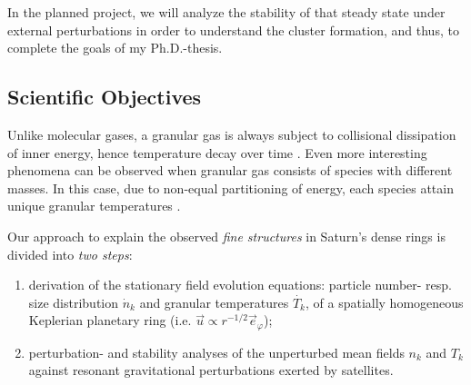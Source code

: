 \documentclass[11pt, notitlepage]{article} %
\begin{document}
In the planned project, we will analyze the stability of that steady state under external perturbations in order to understand the
cluster formation, and thus, to complete the goals of my Ph.D.-thesis.\\

\subsection*{Scientific Objectives}

Unlike molecular gases, a granular gas is always subject to collisional dissipation of inner energy, hence temperature decay 
over time \citep{Haff1983, Brilliantov2004}. Even more interesting phenomena can be observed when granular gas consists of 
species with different masses. In this case,  due to non-equal partitioning of energy, each species attain unique granular
temperatures \citep{Garzo2007c, Osinsky2020}. 

Our approach to explain the observed \emph{fine structures} in Saturn's dense rings is divided into \emph{two steps}:
\begin{enumerate}
      \item derivation of the stationary field evolution equations:  particle number- resp. size distribution $\dot n_k$ and granular 
      temperatures $\dot {T_k}$, of a spatially homogeneous Keplerian planetary ring (i.e. $\vec u \propto r^{-1/2} \vec e_\varphi$);
	\item perturbation- and stability analyses of the unperturbed mean fields $n_k$ and $T_k$ against resonant gravitational perturbations 
	exerted by satellites.
\end{enumerate}
\end{document}
